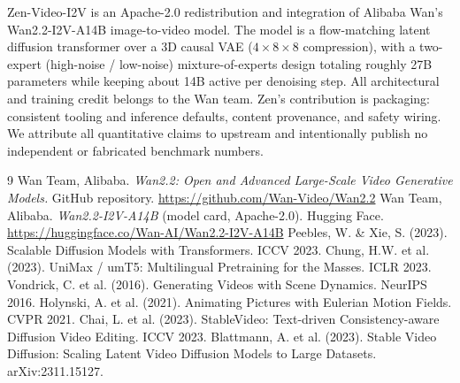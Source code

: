 \documentclass[11pt,a4paper]{article}
\begin{document}
Zen-Video-I2V is an Apache-2.0 redistribution and integration of Alibaba Wan's Wan2.2-I2V-A14B image-to-video model. The model is a flow-matching latent diffusion transformer over a 3D causal VAE ($4\times 8\times 8$ compression), with a two-expert (high-noise / low-noise) mixture-of-experts design totaling roughly 27B parameters while keeping about 14B active per denoising step. All architectural and training credit belongs to the Wan team. Zen's contribution is packaging: consistent tooling and inference defaults, content provenance, and safety wiring. We attribute all quantitative claims to upstream and intentionally publish no independent or fabricated benchmark numbers.

\begin{thebibliography}{9}
 Wan Team, Alibaba. \emph{Wan2.2: Open and Advanced Large-Scale Video Generative Models.} GitHub repository. \url{https://github.com/Wan-Video/Wan2.2}
 Wan Team, Alibaba. \emph{Wan2.2-I2V-A14B} (model card, Apache-2.0). Hugging Face. \url{https://huggingface.co/Wan-AI/Wan2.2-I2V-A14B}
 Peebles, W. \& Xie, S. (2023). Scalable Diffusion Models with Transformers. ICCV 2023.
 Chung, H.W. et al. (2023). UniMax / umT5: Multilingual Pretraining for the Masses. ICLR 2023.
 Vondrick, C. et al. (2016). Generating Videos with Scene Dynamics. NeurIPS 2016.
 Holynski, A. et al. (2021). Animating Pictures with Eulerian Motion Fields. CVPR 2021.
 Chai, L. et al. (2023). StableVideo: Text-driven Consistency-aware Diffusion Video Editing. ICCV 2023.
 Blattmann, A. et al. (2023). Stable Video Diffusion: Scaling Latent Video Diffusion Models to Large Datasets. arXiv:2311.15127.
\end{thebibliography}
\end{document}
